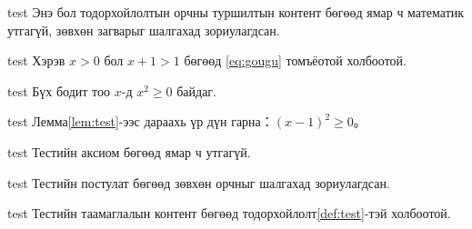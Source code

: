 \documentclass[nm]{../../elegantbook}
\begin{document}
\ifdefined\simpleTest
\begin{definition}\label{def:test}
\else
\begin{definition}{test}
\fi
Энэ бол тодорхойлолтын орчны туршилтын контент бөгөөд ямар ч математик утгагүй, зөвхөн загварыг шалгахад зориулагдсан.
\end{definition}

\ifdefined\simpleTest
\begin{theorem}\label{thm:test}
\else
\begin{theorem}{test}
\fi
Хэрэв $x>0$ бол $x+1>1$ бөгөөд \eqref{eq:gougu} томъёотой холбоотой.
\end{theorem}

\ifdefined\simpleTest
\begin{lemma}\label{lem:test}
\else
\begin{lemma}{test}
\fi
Бүх бодит тоо $x$-д $x^2\geq0$ байдаг.
\end{lemma}

\ifdefined\simpleTest
\begin{corollary}\label{cor:test}
\else
\begin{corollary}{test}
\fi
Лемма\ref{lem:test}-ээс дараахь үр дүн гарна：$(x-1)^2\geq0$。
\end{corollary}

\ifdefined\simpleTest
\begin{axiom}\label{axi:test}
\else
\begin{axiom}{test}
\fi
Тестийн аксиом бөгөөд ямар ч утгагүй.
\end{axiom}

\ifdefined\simpleTest
\begin{postulate}\label{pos:test}
\else
\begin{postulate}{test}
\fi
Тестийн постулат бөгөөд зөвхөн орчныг шалгахад зориулагдсан.
\end{postulate}

\ifdefined\simpleTest
\begin{proposition}\label{pro:test}
\else
\begin{proposition}{test}
\fi
Тестийн таамаглалын контент бөгөөд тодорхойлолт\ref{def:test}-тэй холбоотой.
\end{proposition}


\end{proposition}
\end{postulate}
\end{axiom}
\end{corollary}
\end{lemma}
\end{theorem}
\end{definition}
\end{document}
